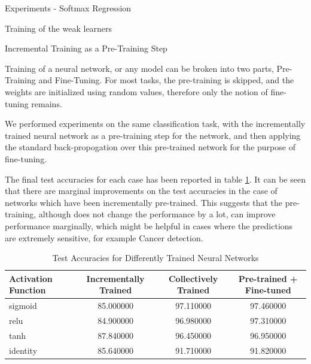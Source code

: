 \documentclass{article}
\begin{document}
\begin{psection}{Experiments - Softmax Regression}
\begin{psubsection}{Training of the weak learners}
	\end{psubsection}

	\begin{psubsection}{Incremental Training as a Pre-Training Step}

		Training of a neural network, or any model can be broken into two parts, Pre-Training and Fine-Tuning. For most tasks, the pre-training is skipped, and the weights are initialized using random values, therefore only the notion of fine-tuning remains.

		We performed experiments on the same classification task, with the incrementally trained neural network as a pre-training step for the network, and then applying the standard back-propogation over this pre-trained network for the purpose of fine-tuning.

		The final test accuracies for each case has been reported in table \ref{tab:accuracies}. It can be seen that there are marginal improvements on the test accuracies in the case of networks which have been incrementally pre-trained. This suggests that the pre-training, although does not change the performance by a lot, can improve performance marginally, which might be helpful in cases where the predictions are extremely sensitive, for example Cancer detection.

		\begin{table}[h!]
			\centering
			\begin{tabular}{|l|c|c|c|}
				\hline
				Activation Function	&	Incrementally Trained	&	Collectively Trained	&	Pre-trained + Fine-tuned	\\
				\hline
				sigmoid				&	85.000000				&	97.110000				&	97.460000					\\
				relu				&	84.900000				&	96.980000				&	97.310000					\\
				tanh				&	87.840000				&	96.450000				&	96.950000					\\
				identity			&	85.640000				&	91.710000				&	91.820000					\\
				\hline
			\end{tabular}
			\caption{Test Accuracies for Differently Trained Neural Networks}
			\label{tab:accuracies}
		\end{table}

	\end{psubsection}

\end{psection}
\end{document}
